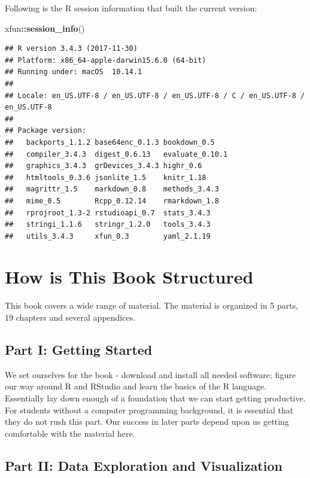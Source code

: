 \documentclass[]{krantz}
\makeatletter
\newenvironment{Shaded}{\begin{snugshade}}{\end{snugshade}}
\newcommand{\KeywordTok}[1]{\textcolor[rgb]{0.27,0.27,0.27}{\textbf{#1}}}
\newcommand{\OperatorTok}[1]{\textcolor[rgb]{0.81,0.36,0.00}{\textbf{#1}}}
\newcommand{\NormalTok}[1]{#1}
\newenvironment{kframe}{%
\medskip{}
\setlength{\fboxsep}{.8em}
 \def\at@end@of@kframe{}%
 \ifinner\ifhmode%
  \def\at@end@of@kframe{\end{minipage}}%
  \begin{minipage}{\columnwidth}%
 \fi\fi%
 \def\FrameCommand##1{\hskip\@totalleftmargin \hskip-\fboxsep
 \colorbox{shadecolor}{##1}\hskip-\fboxsep
     \hskip-\linewidth \hskip-\@totalleftmargin \hskip\columnwidth}%
 \MakeFramed {\advance\hsize-\width
   \@totalleftmargin\z@ \linewidth\hsize
   \@setminipage}}%
 {\par\unskip\endMakeFramed%
 \at@end@of@kframe}
\renewenvironment{Shaded}{\begin{kframe}}{\end{kframe}}
\theoremstyle{definition}
\theoremstyle{definition}
\theoremstyle{definition}
\theoremstyle{remark}
\makeatother
\begin{document}
Following is the R session information that built the current version:

\begin{Shaded}
\begin{Highlighting}[]
\NormalTok{xfun}\OperatorTok{::}\KeywordTok{session_info}\NormalTok{()}
\end{Highlighting}
\end{Shaded}

\begin{verbatim}
## R version 3.4.3 (2017-11-30)
## Platform: x86_64-apple-darwin15.6.0 (64-bit)
## Running under: macOS  10.14.1
## 
## Locale: en_US.UTF-8 / en_US.UTF-8 / en_US.UTF-8 / C / en_US.UTF-8 / en_US.UTF-8
## 
## Package version:
##   backports_1.1.2 base64enc_0.1.3 bookdown_0.5   
##   compiler_3.4.3  digest_0.6.13   evaluate_0.10.1
##   graphics_3.4.3  grDevices_3.4.3 highr_0.6      
##   htmltools_0.3.6 jsonlite_1.5    knitr_1.18     
##   magrittr_1.5    markdown_0.8    methods_3.4.3  
##   mime_0.5        Rcpp_0.12.14    rmarkdown_1.8  
##   rprojroot_1.3-2 rstudioapi_0.7  stats_3.4.3    
##   stringi_1.1.6   stringr_1.2.0   tools_3.4.3    
##   utils_3.4.3     xfun_0.3        yaml_2.1.19
\end{verbatim}

\section*{How is This Book
Structured}\label{how-is-this-book-structured}


This book covers a wide range of material. The material is organized in
5 parts, 19 chapters and several appendices.

\subsection*{Part I: Getting Started}\label{part-i-getting-started}


We set ourselves for the book - download and install all needed
software; figure our way around R and RStudio and learn the basics of
the R language. Essentially lay down enough of a foundation that we can
start getting productive. For students without a computer programming
background, it is essential that they do not rush this part. Our success
in later parts depend upon us getting comfortable with the material
here.

\subsection*{Part II: Data Exploration and
Visualization}\label{part-ii-data-exploration-and-visualization}
\end{document}
